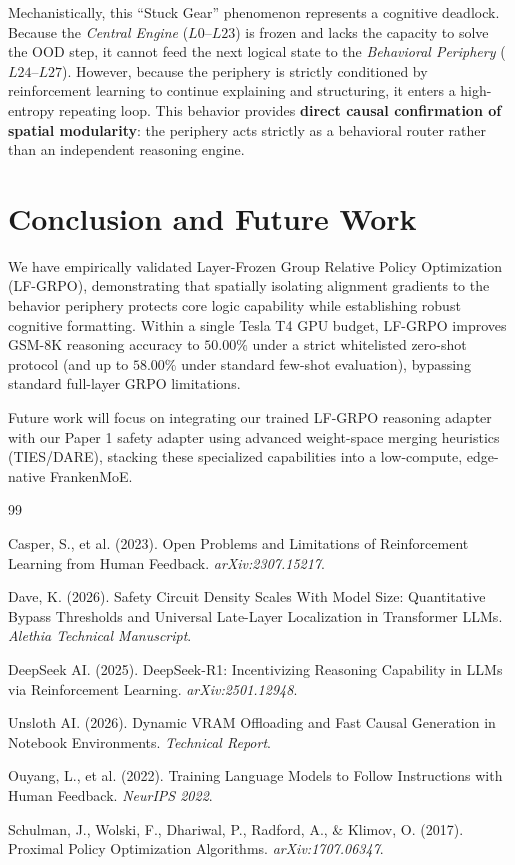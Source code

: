 \documentclass[11pt]{article}
\begin{document}
Mechanistically, this ``Stuck Gear'' phenomenon represents a cognitive deadlock. Because the \textit{Central Engine} ($L0$--$L23$) is frozen and lacks the capacity to solve the OOD step, it cannot feed the next logical state to the \textit{Behavioral Periphery} ($L24$--$L27$). However, because the periphery is strictly conditioned by reinforcement learning to continue explaining and structuring, it enters a high-entropy repeating loop. This behavior provides \textbf{direct causal confirmation of spatial modularity}: the periphery acts strictly as a behavioral router rather than an independent reasoning engine.

\section{Conclusion and Future Work}

We have empirically validated Layer-Frozen Group Relative Policy Optimization (LF-GRPO), demonstrating that spatially isolating alignment gradients to the behavior periphery protects core logic capability while establishing robust cognitive formatting. Within a single Tesla T4 GPU budget, LF-GRPO improves GSM-8K reasoning accuracy to $50.00\%$ under a strict whitelisted zero-shot protocol (and up to $58.00\%$ under standard few-shot evaluation), bypassing standard full-layer GRPO limitations.

Future work will focus on integrating our trained LF-GRPO reasoning adapter with our Paper 1 safety adapter using advanced weight-space merging heuristics (TIES/DARE), stacking these specialized capabilities into a low-compute, edge-native FrankenMoE.

\begin{thebibliography}{99}

Casper, S., et al. (2023). Open Problems and Limitations of Reinforcement Learning from Human Feedback. \textit{arXiv:2307.15217}.

Dave, K. (2026). Safety Circuit Density Scales With Model Size: Quantitative Bypass Thresholds and Universal Late-Layer Localization in Transformer LLMs. \textit{Alethia Technical Manuscript}.

DeepSeek AI. (2025). DeepSeek-R1: Incentivizing Reasoning Capability in LLMs via Reinforcement Learning. \textit{arXiv:2501.12948}.

Unsloth AI. (2026). Dynamic VRAM Offloading and Fast Causal Generation in Notebook Environments. \textit{Technical Report}.

Ouyang, L., et al. (2022). Training Language Models to Follow Instructions with Human Feedback. \textit{NeurIPS 2022}.

Schulman, J., Wolski, F., Dhariwal, P., Radford, A., \& Klimov, O. (2017). Proximal Policy Optimization Algorithms. \textit{arXiv:1707.06347}.

\end{thebibliography}
\end{document}
